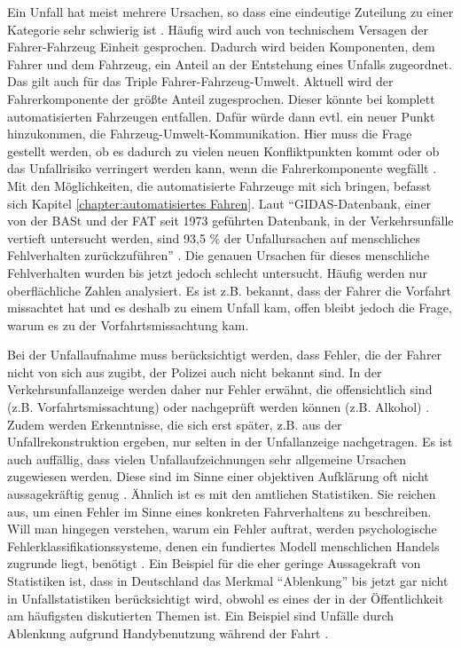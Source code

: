Ein Unfall hat meist mehrere Ursachen, so dass eine eindeutige Zuteilung zu einer Kategorie sehr schwierig ist \parencite[S. 78]{Grundl.2005}. Häufig wird auch von technischem Versagen der Fahrer-Fahrzeug Einheit gesprochen. Dadurch wird beiden Komponenten, dem Fahrer und dem Fahrzeug, ein Anteil an der Entstehung eines Unfalls zugeordnet. Das gilt auch für das Triple Fahrer-Fahrzeug-Umwelt. Aktuell wird der Fahrerkomponente der größte Anteil zugesprochen. Dieser könnte bei komplett automatisierten Fahrzeugen entfallen. Dafür würde dann evtl. ein neuer Punkt hinzukommen, die Fahrzeug-Umwelt-Kommunikation. Hier muss die Frage gestellt werden, ob es dadurch zu vielen neuen Konfliktpunkten kommt oder ob das Unfallrisiko verringert werden kann, wenn die Fahrerkomponente wegfällt \parencite[S. 70]{Bock.1989}. Mit den Möglichkeiten, die automatisierte Fahrzeuge mit sich bringen, befasst sich Kapitel \ref{chapter:automatisiertes Fahren}. Laut \enquote{\ac{GIDAS}-Datenbank, einer von der \ac{BASt} und der \ac{FAT} seit 1973 geführten Datenbank, in der Verkehrsunfälle vertieft untersucht werden, sind 93,5 \% der Unfallursachen auf menschliches Fehlverhalten zurückzuführen} \parencite[S. 10]{Grundl.2005}. Die genauen Ursachen für dieses menschliche Fehlverhalten wurden bis jetzt jedoch schlecht untersucht. Häufig werden nur oberflächliche Zahlen analysiert. Es ist z.B. bekannt, dass der Fahrer die Vorfahrt missachtet hat und es deshalb zu einem Unfall kam, offen bleibt jedoch die Frage, warum es zu der Vorfahrtsmissachtung kam.

Bei der Unfallaufnahme muss berücksichtigt werden, dass Fehler, die der Fahrer nicht von sich aus zugibt, der Polizei auch nicht bekannt sind. In der Verkehrsunfallanzeige werden daher nur Fehler erwähnt, die offensichtlich sind (z.B. Vorfahrtsmissachtung) oder nachgeprüft werden können (z.B. Alkohol) \parencite[S. 27]{Grundl.2005}. Zudem werden Erkenntnisse, die sich erst später, z.B. aus der Unfallrekonstruktion ergeben, nur selten in der Unfallanzeige nachgetragen. Es ist auch auffällig, dass vielen Unfallaufzeichnungen sehr allgemeine Ursachen zugewiesen werden. Diese sind im Sinne einer objektiven Aufklärung oft nicht aussagekräftig genug \parencite[S. 11]{DEKRA.2017}. Ähnlich ist es mit den amtlichen Statistiken. Sie reichen aus, um einen Fehler im Sinne eines konkreten Fahrverhaltens zu beschreiben. Will man hingegen verstehen, warum ein Fehler auftrat, werden psychologische Fehlerklassifikationssysteme, denen ein fundiertes Modell menschlichen Handels zugrunde liegt, benötigt \parencite[S. 79]{Grundl.2005}. Ein Beispiel für die eher geringe Aussagekraft von Statistiken ist, dass in Deutschland das Merkmal \enquote{Ablenkung} bis jetzt gar nicht in Unfallstatistiken berücksichtigt wird, obwohl es eines der in der Öffentlichkeit am häufigsten diskutierten Themen ist. Ein Beispiel sind Unfälle durch Ablenkung aufgrund Handybenutzung während der Fahrt \parencite[S. 42]{DEKRA.2017}.

